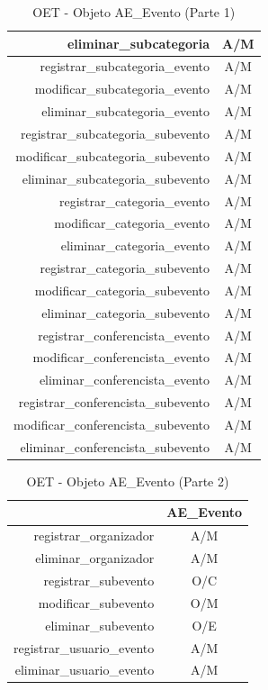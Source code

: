 \begin{indentar}
\begin{table}
\begin{center}
\begin{tabular}{|r|c|}
		\hline
			eliminar\_subcategoria	& A/M \\
		\hline
			registrar\_subcategoria\_evento	& A/M \\
		\hline
			modificar\_subcategoria\_evento	& A/M \\
		\hline
			eliminar\_subcategoria\_evento	& A/M \\
		\hline
			registrar\_subcategoria\_subevento	& A/M \\
		\hline
			modificar\_subcategoria\_subevento	& A/M \\
		\hline
			eliminar\_subcategoria\_subevento	& A/M \\
		\hline
			registrar\_categoria\_evento	& A/M \\
		\hline
			modificar\_categoria\_evento	& A/M \\
		\hline
			eliminar\_categoria\_evento	& A/M \\
		\hline
			registrar\_categoria\_subevento	& A/M \\
		\hline
			modificar\_categoria\_subevento	& A/M \\
		\hline
			eliminar\_categoria\_subevento	& A/M \\
		\hline
			registrar\_conferencista\_evento	& A/M \\
		\hline
			modificar\_conferencista\_evento	& A/M \\
		\hline
			eliminar\_conferencista\_evento	& A/M \\
		\hline
			registrar\_conferencista\_subevento	& A/M \\
		\hline
			modificar\_conferencista\_subevento	& A/M \\
		\hline
			eliminar\_conferencista\_subevento	& A/M \\
		\hline
	\end{tabular}
	\caption{OET - Objeto AE\_Evento (Parte 1)}
	\label{oet:evento}
	\end{center}
\end{table}

\begin{table}
	\begin{center}
	\begin{tabular}{|r|c|}
		\hline
				& \textbf{AE\_Evento} \\
		\hline\hline
			registrar\_organizador	& A/M \\
		\hline
			eliminar\_organizador	& A/M \\
		\hline
			registrar\_subevento	& O/C \\
		\hline
			modificar\_subevento	& O/M \\
		\hline
			eliminar\_subevento	& O/E \\
		\hline
			registrar\_usuario\_evento	& A/M \\
		\hline
			eliminar\_usuario\_evento	& A/M \\
		\hline
	\end{tabular}
	\caption{OET - Objeto AE\_Evento (Parte 2)}
	\label{oet:evento}
	\end{center}
\end{table}

\end{indentar}

